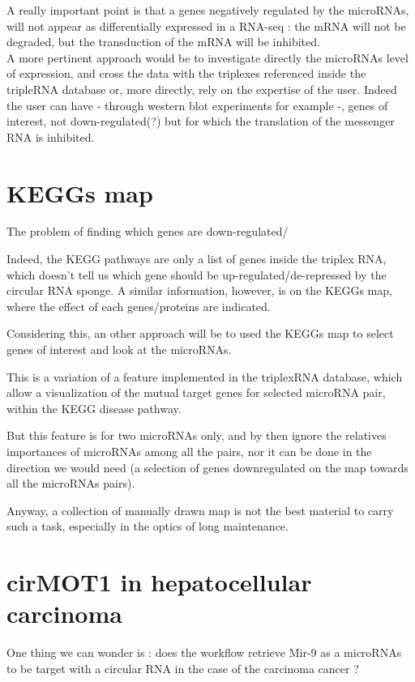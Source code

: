 \documentclass[a4paper,12pt]{report}
\begin{document}
A really important point is that a genes negatively regulated by the microRNAs, will not appear as differentially expressed in a RNA-seq : the mRNA will not be degraded, but the transduction of the mRNA will be inhibited.\\

A more pertinent approach would be to investigate directly the microRNAs level of expression, and cross the data with the triplexes referenced inside the tripleRNA database or, more directly, rely on the expertise of the user. Indeed the user can have - through western blot experiments for example -, genes of interest, not down-regulated(?) but for which the translation of the messenger RNA is inhibited.\\

\section{KEGGs map}

The problem of finding which genes are down-regulated/

Indeed, the KEGG pathways are only a list of genes inside the triplex RNA, which doesn't tell us which gene should be up-regulated/de-repressed by the circular RNA sponge. A similar information, however, is on the KEGGs map, where the effect of each genes/proteins are indicated.

Considering this, an other approach will be to used the KEGGs map to select genes of interest and look at the microRNAs.

This is a variation of a feature implemented in the triplexRNA database, which allow a visualization of the mutual target genes for selected microRNA pair, within the KEGG disease pathway. 

But this feature is for two microRNAs only, and by then ignore the relatives importances of microRNAs among all the pairs, nor it can be done in the direction we would need (a selection of genes downregulated on the map towards all the microRNAs pairs).

Anyway, a collection of manually drawn map is not the best material to carry such a task, especially in the optics of long maintenance.
 

\section{cirMOT1 in hepatocellular carcinoma}
One thing we can wonder is : does the workflow retrieve Mir-9 as a microRNAs to be target with a circular RNA in the case of the carcinoma cancer ?
\end{document}
